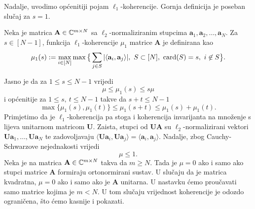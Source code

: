\documentclass[a4paper,twoside,12pt]{memoir} %
\newcommand{\vect}[1]{\mathbf{#1}}
\renewcommand{\vec}{\vect}
\newcommand{\card}{\text{\normalfont{card}}}
\begin{document}
Nadalje, uvodimo op\'cenitiji pojam $\ell_1$-koherencije. Gornja definicija je poseban slu\v{c}aj za $s = 1$.
\begin{defn}
    Neka je matrica $\vec A \in \C^{m \times N}$ sa $\ell_2$-normaliziranim stupcima  $\vec a_1, \vec a_2, \dots, \vec a_N$. Za $s \in [N-1]$, funkcija $\ell_1$-koherencije $\mu_1$ matrice $\vec A$ je definirana kao
    \begin{equation*}
        \mu_1(s) := \max_{i \in [N]} \max \big\{ \sum_{j \in S} |\langle \vec a_i, \vec a_j \rangle|,\ S \subset [N],\ \card(S) = s,\ i \not \in S   \big\} .
    \end{equation*}
\end{defn}
Jasno je da za $1 \leq s \leq N-1$ vrijedi
\begin{equation}\label{5:2}
    \mu \leq \mu_1(s) \leq s \mu
\end{equation}
i op\'cenitije za $1 \leq s,\ t \leq N-1$ takve da $s+t \leq N-1$
\begin{equation}\label{5:3}
    \max \{\mu_1(s), \mu_1(t)\}  \leq \mu_1(s+t) \leq \mu_1(s) + \mu_1(t).
\end{equation}
Primjetimo da je $\ell_1$-koherencija pa stoga i koherencija invarijanta na mno\v{z}enje s lijeva unitarnom matricom $\vec U$. Zaista, stupci od $\vec{UA}$ su $\ell_2$-normalizirani vektori $\vec{Ua}_1, \dots, \vec{Ua}_N$ te zadovoljavaju $\langle \vec{Ua}_i, \vec{Ua}_j \rangle = \langle \vec a_i , \vec a_j \rangle$. Nadalje, zbog Cauchy-Schwarzove nejednakosti vrijedi
\begin{equation*}
   \mu \leq 1. 
\end{equation*}
Neka je na matrica $\vec A \in \C^{m \times N}$ takva da $m \geq N$. Tada je $\mu = 0$ ako i samo ako stupci matrice $\vec A$ formiraju ortonormirani sustav. U slu\v{c}aju da je matrica kvadratna, $\mu = 0$ ako i samo ako je $\vec A$ unitarna. U nastavku \'cemo prou\v{c}avati samo matrice kojima je $m < N$. U tom slu\v{c}aju vrijednost koherencije je odozdo ograni\v{c}ena, \v{s}to \'cemo kasnije i pokazati. 
\end{document}
